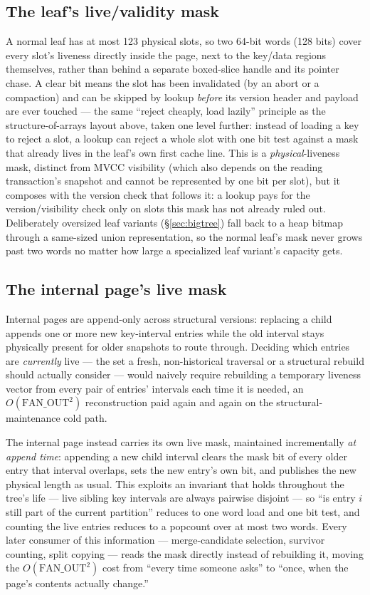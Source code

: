 \documentclass[11pt]{article}
\begin{document}
\subsection{The leaf's live/validity mask}

A normal leaf has at most 123 physical slots, so two 64-bit words (128 bits) cover
every slot's liveness directly inside the page, next to the key/data regions
themselves, rather than behind a separate boxed-slice handle and its pointer chase.
A clear bit means the slot has been invalidated (by an abort or a compaction) and
can be skipped by lookup \emph{before} its version header and payload are ever
touched --- the same ``reject cheaply, load lazily'' principle as the
structure-of-arrays layout above, taken one level further: instead of loading a key
to reject a slot, a lookup can reject a whole slot with one bit test against a mask
that already lives in the leaf's own first cache line. This is a
\emph{physical}-liveness mask, distinct from MVCC visibility (which also depends on
the reading transaction's snapshot and cannot be represented by one bit per slot),
but it composes with the version check that follows it: a lookup pays for the
version/visibility check only on slots this mask has not already ruled out.
Deliberately oversized leaf variants (\S\ref{sec:bigtree}) fall back to a heap
bitmap through a same-sized union representation, so the normal leaf's mask never
grows past two words no matter how large a specialized leaf variant's capacity gets.

\subsection{The internal page's live mask}

Internal pages are append-only across structural versions: replacing a child
appends one or more new key-interval entries while the old interval stays
physically present for older snapshots to route through. Deciding which entries are
\emph{currently} live --- the set a fresh, non-historical traversal or a structural
rebuild should actually consider --- would naively require rebuilding a temporary
liveness vector from every pair of entries' intervals each time it is needed, an
$O(\mathrm{FAN\_OUT}^2)$ reconstruction paid again and again on the structural-maintenance
cold path.

The internal page instead carries its own live mask, maintained incrementally
\emph{at append time}: appending a new child interval clears the mask bit of every
older entry that interval overlaps, sets the new entry's own bit, and publishes the
new physical length as usual. This exploits an invariant that holds throughout the
tree's life --- live sibling key intervals are always pairwise disjoint --- so ``is
entry $i$ still part of the current partition'' reduces to one word load and one bit
test, and counting the live entries reduces to a popcount over at most two words.
Every later consumer of this information --- merge-candidate selection, survivor
counting, split copying --- reads the mask directly instead of rebuilding it, moving
the $O(\mathrm{FAN\_OUT}^2)$ cost from ``every time someone asks'' to ``once, when
the page's contents actually change.''
\end{document}
